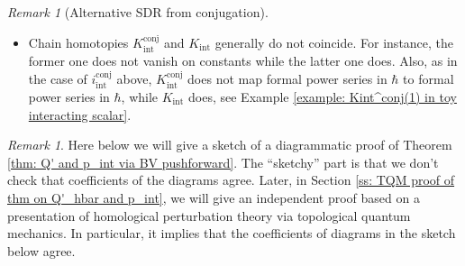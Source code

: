 \documentclass{amsart}
\theoremstyle{plain} %
\theoremstyle{definition}
\theoremstyle{remark}
\newtheorem{rem}[thm]{Remark}
\newcommand{\mr}{\mathrm}
\newcommand{\ra}{\rightarrow}
\newcommand{\F}{\mathcal{F}}
\newcommand{\ii}{\mathrm{int}}
\begin{document}
\begin{rem}[Alternative SDR from conjugation]
\begin{itemize}
        On the other hand $i_\ii$ has a classical limit, which moreover is a morphism of commutative dg algebras, and thus is a pullback by an $L_\infty$ morphism (a nonlinear map) $\pi_\ii\colon \F\ra \F'$, see Corollary \ref{cor: class limit of interacting ipK via flow of H^cl} (\ref{cor: class limit of interacting ipK via flow of H^cl (b)}) and Remark \ref{rem: L_infty language} below.
        \item Chain homotopies $K_\ii^\mr{conj}$ and $K_\ii$ generally do not coincide. For instance, the former one does not vanish on constants while the latter one does. Also, as in the case of $i_\ii^\mr{conj}$ above, $K_\ii^\mr{conj}$ does not map formal power series in $\hbar$ to formal power series in $\hbar$, while $K_\ii$ does, see Example \ref{example: Kint^conj(1) in toy interacting scalar}.
    \end{itemize}
\end{rem}

\begin{rem}\label{rem: two proofs of Thm 5.1 imply correct coeffs}
Here below we will give a sketch of a diagrammatic proof of Theorem \ref{thm: Q' and p_int via BV pushforward}. The ``sketchy'' part is that we don't check that coefficients of the diagrams agree. Later, in Section \ref{ss: TQM proof of thm on Q'_hbar and p_int}, we will give an independent proof based on a presentation of homological perturbation theory via topological quantum mechanics.
In particular, it implies that the coefficients of diagrams in the sketch below agree.
\end{rem}
\end{document}
